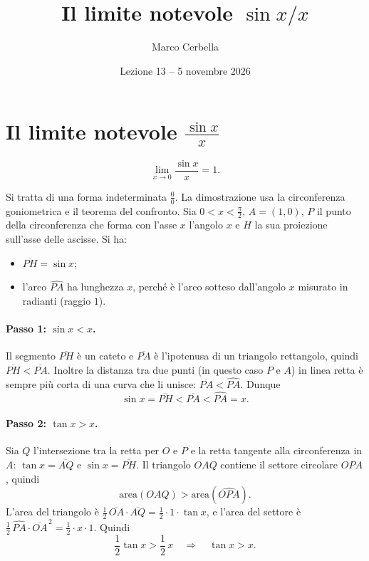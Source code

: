 \documentclass[11pt,a4paper]{article}
\title{Il limite notevole $\sin x / x$}
\author{Marco Cerbella}
\date{Lezione 13 -- 5 novembre 2026}
\begin{document}
\maketitle

\section{Il limite notevole $\frac{\sin x}{x}$}

\begin{teorema}
\[
  \lim_{x\to 0}\frac{\sin x}{x} = 1 .
\]
\end{teorema}

Si tratta di una forma indeterminata $\frac{0}{0}$. La dimostrazione usa la circonferenza goniometrica e il teorema del confronto. Sia $0 < x < \frac{\pi}{2}$, $A = (1, 0)$, $P$ il punto della circonferenza che forma con l'asse $x$ l'angolo $x$ e $H$ la sua proiezione sull'asse delle ascisse. Si ha:
\begin{itemize}
  \item $\overline{PH} = \sin x$;
  \item l'arco $\widehat{PA}$ ha lunghezza $x$, perché è l'arco sotteso dall'angolo $x$ misurato in radianti (raggio $1$).
\end{itemize}

\paragraph{Passo 1: $\sin x < x$.} Il segmento $\overline{PH}$ è un cateto e $\overline{PA}$ è l'ipotenusa di un triangolo rettangolo, quindi $\overline{PH} < \overline{PA}$. Inoltre la distanza tra due punti (in questo caso $P$ e $A$) in linea retta è sempre più corta di una curva che li unisce: $\overline{PA} < \widehat{PA}$. Dunque
\[
  \sin x = \overline{PH} < \overline{PA} < \widehat{PA} = x .
\]

\paragraph{Passo 2: $\tan x > x$.} Sia $Q$ l'intersezione tra la retta per $O$ e $P$ e la retta tangente alla circonferenza in $A$: $\tan x = \overline{AQ}$ e $\sin x = \overline{PH}$. Il triangolo $OAQ$ contiene il settore circolare $OPA$, quindi
\[
  \text{area}(OAQ) > \text{area}(\widehat{OPA}) .
\]
L'area del triangolo è $\frac{1}{2}\,\overline{OA}\cdot\overline{AQ} = \frac{1}{2}\cdot 1\cdot\tan x$, e l'area del settore è $\frac{1}{2}\,\widehat{PA}\cdot\overline{OA}^{\,2} = \frac{1}{2}\cdot x\cdot 1$. Quindi
\[
  \frac{1}{2}\tan x > \frac{1}{2}\,x \quad\Longrightarrow\quad \tan x > x .
\]
\end{document}
